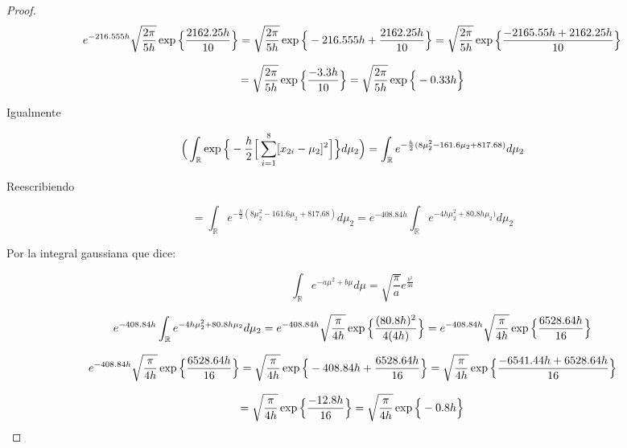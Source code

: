 \documentclass[11pt,letterpaper]{article}
\begin{document}
\begin{proof}
    \begin{equation*}
        e^{-216.555h}\sqrt{\frac{2\pi}{5h}}\exp\Big{\{}\frac{2162.25h}{10}\Big{\}}=\sqrt{\frac{2\pi}{5h}}\exp\Big{\{}-216.555h+\frac{2162.25h}{10}\Big{\}}=\sqrt{\frac{2\pi}{5h}}\exp\Big{\{}\frac{-2165.55h+2162.25h}{10}\Big{\}}
    \end{equation*}

    \begin{equation*}
        =\sqrt{\frac{2\pi}{5h}}\exp\Big{\{}\frac{-3.3h}{10}\Big{\}}=\sqrt{\frac{2\pi}{5h}}\exp\Big{\{}-0.33h\Big{\}}
    \end{equation*}

    Igualmente 

    \begin{equation*}
        \Big{(}\int_{\mathbb{R}}\exp\Big{\{}-\frac{h}{2}\Big{[}\sum_{i=1}^8[x_{2i}-\mu_2]^2\Big{]}\Big{\}}d\mu_2\Big{)}=\int_{\mathbb{R}}e^{-\frac{h}{2}(8\mu_2^2-161.6\mu_2+817.68)}d\mu_2
    \end{equation*}

    Reescribiendo

    \begin{equation*}
        =\int_{\mathbb{R}}e^{-\frac{h}{2}(8\mu_2^2-161.6\mu_2+817.68)}d\mu_2=e^{-408.84h}\int_{\mathbb{R}}e^{-4h\mu_2^2+80.8h\mu_2)}d\mu_2
    \end{equation*}

    Por la integral gaussiana que dice:

    \[
    \int_\mathbb{R}e^{-a\mu^2+b\mu}d\mu=\sqrt{\frac{\pi}{a}}e^{\frac{b^2}{4a}}
    \]

    \begin{equation*}
        e^{-408.84h}\int_{\mathbb{R}}e^{-4h\mu_2^2+80.8h\mu_2}d\mu_2=e^{-408.84h}\sqrt\frac{\pi}{4h}\exp\Big{\{}\frac{(80.8h)^2}{4(4h)}\Big{\}}=e^{-408.84h}\sqrt\frac{\pi}{4h}\exp\Big{\{}\frac{6528.64h}{16}\Big{\}}
    \end{equation*}

    \begin{equation*}
        e^{-408.84h}\sqrt\frac{\pi}{4h}\exp\Big{\{}\frac{6528.64h}{16}\Big{\}}=\sqrt\frac{\pi}{4h}\exp\Big{\{}-408.84h+\frac{6528.64h}{16}\Big{\}}=\sqrt\frac{\pi}{4h}\exp\Big{\{}\frac{-6541.44h+6528.64h}{16}\Big{\}}
    \end{equation*}

    \begin{equation*}
        =\sqrt\frac{\pi}{4h}\exp\Big{\{}\frac{-12.8h}{16}\Big{\}}=\sqrt\frac{\pi}{4h}\exp\Big{\{}-0.8h\Big{\}}
    \end{equation*}


\end{proof}
\end{document}
